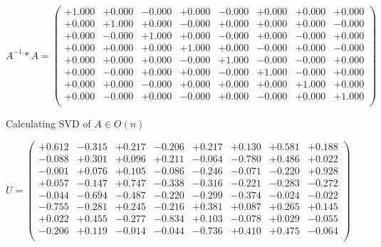\documentclass[9pt]{article}
\theoremstyle{plain}
\theoremstyle{definition}
\theoremstyle{remark}
\numberwithin{equation}{section}
\begin{document}
$A^{-1} *A = \left(
\begin{array}{
cccccccc}
+1.000 & +0.000 & -0.000 & +0.000 & -0.000 & +0.000 & +0.000 & +0.000 \\
+0.000 & +1.000 & +0.000 & -0.000 & +0.000 & +0.000 & +0.000 & -0.000 \\
+0.000 & -0.000 & +1.000 & +0.000 & -0.000 & +0.000 & -0.000 & +0.000 \\
+0.000 & +0.000 & +0.000 & +1.000 & +0.000 & -0.000 & +0.000 & -0.000 \\
+0.000 & +0.000 & +0.000 & -0.000 & +1.000 & -0.000 & -0.000 & +0.000 \\
+0.000 & -0.000 & +0.000 & +0.000 & -0.000 & +1.000 & -0.000 & +0.000 \\
+0.000 & +0.000 & -0.000 & +0.000 & +0.000 & +0.000 & +1.000 & +0.000 \\
+0.000 & -0.000 & +0.000 & -0.000 & +0.000 & -0.000 & +0.000 & +1.000 \\
\end{array}
\right)$ \newline 

Calculating SVD of  $A \in O(n)$

$U = \left(
\begin{array}{
cccccccc}
+0.612 & -0.315 & +0.217 & -0.206 & +0.217 & +0.130 & +0.581 & +0.188 \\
-0.088 & +0.301 & +0.096 & +0.211 & -0.064 & -0.780 & +0.486 & +0.022 \\
-0.001 & +0.076 & +0.105 & -0.086 & -0.246 & -0.071 & -0.220 & +0.928 \\
+0.057 & -0.147 & +0.747 & -0.338 & -0.316 & -0.221 & -0.283 & -0.272 \\
-0.044 & -0.694 & -0.487 & -0.220 & -0.299 & -0.374 & -0.024 & -0.022 \\
-0.755 & -0.281 & +0.245 & -0.216 & +0.381 & +0.087 & +0.265 & +0.145 \\
+0.022 & +0.455 & -0.277 & -0.834 & +0.103 & -0.078 & +0.029 & -0.055 \\
-0.206 & +0.119 & -0.014 & -0.044 & -0.736 & +0.410 & +0.475 & -0.064 \\
\end{array}
\right)$ \newline 
\end{document}
